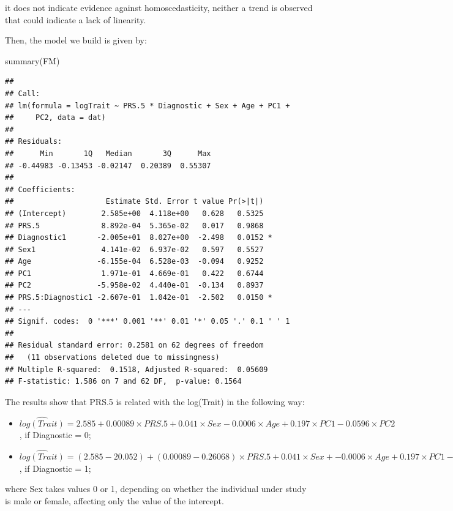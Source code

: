 \documentclass[
]{article}
\newenvironment{Shaded}{\begin{snugshade}}{\end{snugshade}}
\newcommand{\FunctionTok}[1]{\textcolor[rgb]{0.00,0.00,0.00}{#1}}
\newcommand{\NormalTok}[1]{#1}
\providecommand{\tightlist}{%
  \setlength{\itemsep}{0pt}\setlength{\parskip}{0pt}}
\begin{document}
it does not indicate evidence against homoscedasticity, neither a trend
is observed that could indicate a lack of linearity.

Then, the model we build is given by:

\begin{Shaded}
\begin{Highlighting}[]
\FunctionTok{summary}\NormalTok{(FM)}
\end{Highlighting}
\end{Shaded}

\begin{verbatim}
## 
## Call:
## lm(formula = logTrait ~ PRS.5 * Diagnostic + Sex + Age + PC1 + 
##     PC2, data = dat)
## 
## Residuals:
##      Min       1Q   Median       3Q      Max 
## -0.44983 -0.13453 -0.02147  0.20389  0.55307 
## 
## Coefficients:
##                     Estimate Std. Error t value Pr(>|t|)  
## (Intercept)        2.585e+00  4.118e+00   0.628   0.5325  
## PRS.5              8.892e-04  5.365e-02   0.017   0.9868  
## Diagnostic1       -2.005e+01  8.027e+00  -2.498   0.0152 *
## Sex1               4.141e-02  6.937e-02   0.597   0.5527  
## Age               -6.155e-04  6.528e-03  -0.094   0.9252  
## PC1                1.971e-01  4.669e-01   0.422   0.6744  
## PC2               -5.958e-02  4.440e-01  -0.134   0.8937  
## PRS.5:Diagnostic1 -2.607e-01  1.042e-01  -2.502   0.0150 *
## ---
## Signif. codes:  0 '***' 0.001 '**' 0.01 '*' 0.05 '.' 0.1 ' ' 1
## 
## Residual standard error: 0.2581 on 62 degrees of freedom
##   (11 observations deleted due to missingness)
## Multiple R-squared:  0.1518, Adjusted R-squared:  0.05609 
## F-statistic: 1.586 on 7 and 62 DF,  p-value: 0.1564
\end{verbatim}

The results show that PRS.5 is related with the log(Trait) in the
following way:

\begin{itemize}
\tightlist
\item
  \(\widehat{log(Trait)} = 2.585 + 0.00089\times PRS.5 + 0.041\times Sex - 0.0006\times Age + 0.197\times PC1 - 0.0596\times PC2\),
  if Diagnostic = 0;
\item
  \(\widehat{log(Trait)} = (2.585-20.052) + (0.00089-0.26068)\times PRS.5 + 0.041\times Sex + - 0.0006\times Age + 0.197\times PC1 - 0.0596\times PC2\),
  if Diagnostic = 1;
\end{itemize}

where Sex takes values 0 or 1, depending on whether the individual under
study is male or female, affecting only the value of the intercept.
\end{document}
